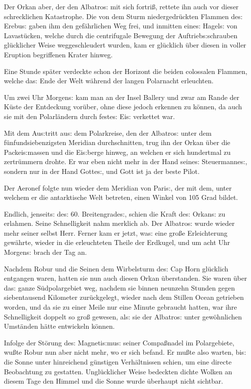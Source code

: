 \documentclass[oneside,12pt]{book}
\newcommand{\s}{s:}
\begin{document}
Der Orkan aber, der den {\glqq}Albatro{\s}{\grqq} mit sich
fortri{\ss}, rettete ihn auch vor dieser schrecklichen Katastrophe.
Die von dem Sturm niedergedr\"uckten Flammen de{\s} Erebu{\s} gaben
ihm den gef\"ahrlichen Weg frei, und inmitten eine{\s} Hagel{\s} von
Lavast\"ucken, welche durch die centrifugale Bewegung der
Auftrieb{\s}schrauben gl\"ucklicher Weise weggeschleudert wurden, kam
er gl\"ucklich \"uber diesen in voller Eruption begriffenen Krater
hinweg.

Eine Stunde sp\"ater verdeckte schon der Horizont die beiden
colossalen Flammen, welche da{\s} Ende der Welt w\"ahrend der langen
Polarnacht erleuchten.

Um zwei Uhr Morgen{\s} kam man an der Insel Ballery und zwar am Rande
der K\"uste der Entdeckung vor\"uber, ohne diese jedoch erkennen zu
k\"onnen, da auch sie mit den Polarl\"andern durch feste{\s} Ei{\s}
verkettet war.

Mit dem Au{\s}tritt au{\s} dem Polarkreise, den der
{\glqq}Albatro{\s}{\grqq} unter dem f\"unfundsiebenzigsten Meridian
durchschnitten, trug ihn der Orkan \"uber die Packei{\s}massen und
die Ei{\s}berge hinweg, an welchen er sich hundertmal zu
zertr\"ummern drohte. Er war eben nicht mehr in der Hand seine{\s}
Steuermanne{\s}, sondern nur in der Hand Gotte{\s}, und Gott ist ja
der beste Pilot.

Der Aeronef folgte nun wieder dem Meridian von Pari{\s}, der mit dem,
unter welchem er die antarktische Welt betreten, einen Winkel von 105
Grad bildet.

Endlich, jenseit{\s} de{\s} 60. Breitengrade{\s}, schien die Kraft
de{\s} Orkan{\s} zu erlahmen. Seine Schnelligkeit nahm merklich ab.
Der {\glqq}Albatro{\s}{\grqq} wurde wieder mehr seiner selbst Herr.
Ferner kam er jetzt, wa{\s} eine gro{\ss}e Erleichterung gew\"ahrte,
wieder in die erleuchteten Theile der Erdkugel, und um acht Uhr
Morgen{\s} brach der Tag an.

Nachdem Robur und die Seinen dem Wirbelsturm de{\s} Cap Horn
gl\"ucklich entgangen waren, hatten sie nun auch diesen Orkan
\"uberstanden. Sie waren \"uber da{\s} ganze S\"udpolargebiet weg,
nachdem sie binnen neunzehn Stunden gegen siebentausend Kilometer
zur\"uckgelegt, wieder nach dem Stillen Ocean getrieben worden, und
da sie zu einer Meile nur eine Minute gebraucht hatten, war ihre
Schnelligkeit doppelt so gro{\ss} gewesen, al{\s} sie der
{\glqq}Albatro{\s}{\grqq} unter gew\"ohnlichen Umst\"anden h\"atte
entwickeln k\"onnen.

Infolge der St\"orung de{\s} Magneti{\s}mu{\s} seiner Compa{\ss}nadel
im Polargebiete, wu{\ss}te Robur nun aber nicht mehr, wo er sich
befand. Er mu{\ss}te also warten, bi{\s} die Sonne unter hinreichend
g\"unstigen Verh\"altnissen schien, um eine directe Beobachtung zu
gestatten. Ungl\"ucklicher Weise bedeckten dichte Wolken an diesem
Tage den Himmel und die Sonne wurde \"uberhaupt nicht sichtbar.
\end{document}
